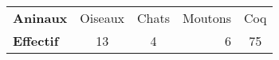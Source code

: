 \documentclass[a4paper,12pt]{report}
\begin{document}
\begin{tabular}{lccrc}
\textbf{Aninaux} & Oiseaux & Chats & Moutons & Coq \\
\textbf{Effectif} & 13 & 4 & 6 & 75\\
\end{tabular}
\end{document}
